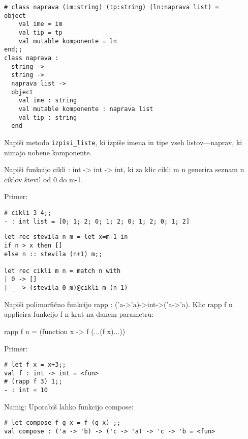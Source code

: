 \begin{ex}
\begin{verbatim}
# class naprava (im:string) (tp:string) (ln:naprava list) = 
object 
    val ime = im 
    val tip = tp 
    val mutable komponente = ln 
end;; 
class naprava : 
  string -> 
  string -> 
  naprava list -> 
  object 
    val ime : string 
    val mutable komponente : naprava list 
    val tip : string 
  end 

\end{verbatim}
Napi\v si metodo \texttt{izpisi\_liste}, ki izpi\v se imena in tipe vseh listov—naprav, ki nimajo nobene komponente.



\end{ex} \begin{ex}
Napi\v si funkcijo cikli : int -> int -> int, ki za klic cikli m n generira seznam n ciklov \v stevil od 0 do m-1. 

Primer:

\begin{verbatim}
# cikli 3 4;; 
- : int list = [0; 1; 2; 0; 1; 2; 0; 1; 2; 0; 1; 2]
\end{verbatim}

\begin{sol}
\begin{verbatim}
let rec stevila n m = let x=m-1 in
if n > x then []
else n :: stevila (n+1) m;;

let rec cikli m n = match n with
| 0 -> []
| _ -> (stevila 0 m)@cikli m (n-1)
\end{verbatim}
\end{sol}

\end{ex} \begin{ex}
Napi\v si polimorfi\v cno funkcijo rapp : ('a->'a)->int->('a->'a). Klic rapp f n applicira funkcijo f n-krat na danem parametru:

          rapp f n = (function x -> f (...(f x)...))     

Primer:            

\begin{verbatim}
# let f x = x+3;; 
val f : int -> int = <fun> 
# (rapp f 3) 1;; 
- : int = 10 

\end{verbatim}
Namig:  
Uporabi\v s lahko funkcijo compose:

\begin{verbatim}
# let compose f g x = f (g x) ;; 
val compose : ('a -> 'b) -> ('c -> 'a) -> 'c -> 'b = <fun> 

\end{verbatim}


\end{ex}
